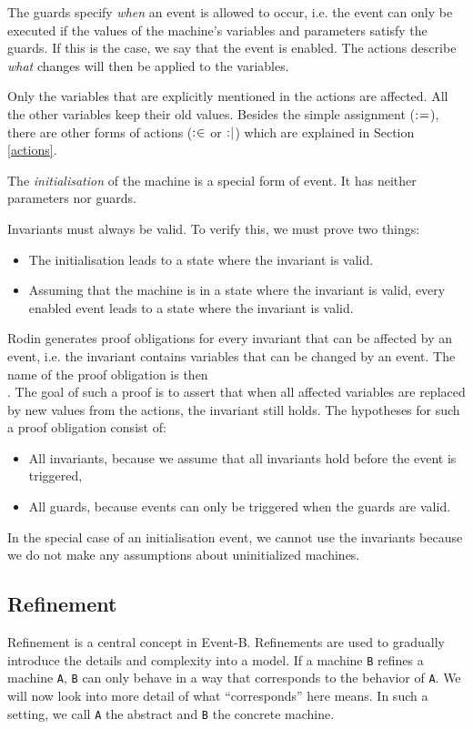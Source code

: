 The guards specify \emph{when} an event is allowed to occur, i.e. the event can only be executed if the values of the machine's variables and parameters satisfy the guards. If this is the case, we say that the event is enabled.
The actions describe \emph{what} changes will then be applied to the variables.

Only the variables that are explicitly mentioned in the actions are affected.
All the other variables keep their old values. Besides the simple assignment ($\mathrel{:\mkern1mu=}$),
there are other forms of actions ($\mathrel{:\mkern1mu\in}$ or $\mathrel{:\mkern1mu\mid}$) which are explained in
Section \ref{actions}.

The \emph{initialisation} of the machine is a special form of event. It has neither parameters
nor guards.

Invariants must always be valid. To verify this, we must prove two things:
\begin{itemize}
  \item The initialisation leads to a state where the invariant is valid.
  \item Assuming that the machine is in a state where the invariant is valid,
    every enabled event leads to a state where the invariant is valid.
\end{itemize}

Rodin generates proof obligations for every invariant that can be affected by an event, i.e. the invariant contains variables that can be changed by an event.
The name of the proof obligation is then \\ .
The goal of such a proof is to assert that when all affected variables are replaced by new values from the actions, the invariant still holds. The hypotheses for such a proof obligation consist of:

\begin{itemize}

\item All invariants, because we assume that all invariants hold before the event is triggered,
\item All guards, because events can only be triggered when the guards are valid.
\end{itemize}

In the special case of an initialisation event, we cannot use the invariants because we do not make any assumptions about uninitialized machines.

\subsection{Refinement}
\label{tut_refinement}
Refinement is a central concept in Event-B. Refinements are used to gradually
introduce the details and complexity into a model.
If a machine \texttt{B} refines a machine \texttt{A}, \texttt{B} can only behave in a way that
corresponds to the behavior of \texttt{A}. We will now look into more detail of what ``corresponds''
here means.
In such a setting, we call \texttt{A} the abstract and \texttt{B} the concrete machine.

